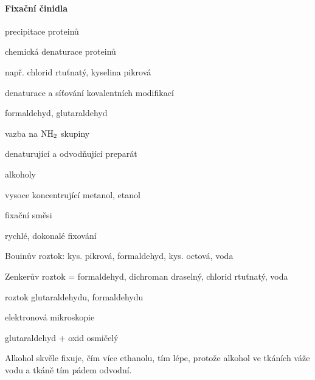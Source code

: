 \documentclass[DIV=8]{scrreprt}
\begin{document}
\paragraph{Fixační činidla}
\begin{myItemize}[nosep]
    \item precipitace proteinů
\begin{myItemize}[nosep]
    \item chemická denaturace proteinů
    \item např. chlorid rtuťnatý, kyselina pikrová
\end{myItemize}

    \item denaturace a síťování kovalentních modifikací
\begin{myItemize}[nosep]
    \item formaldehyd, glutaraldehyd
    \item vazba na \(\ce{NH2}\) skupiny
\end{myItemize}

    \item denaturující a odvodňující preparát
\begin{myItemize}[nosep]
    \item alkoholy
    \item vysoce koncentrující metanol, etanol
\end{myItemize}

    \item fixační směsi
\begin{myItemize}[nosep]
    \item rychlé, dokonalé fixování
    \item Bouinův roztok: kys. pikrová, formaldehyd, kys. octová, voda
    \item Zenkerův roztok = formaldehyd, dichroman draselný, chlorid rtuťnatý, voda
    \item roztok glutaraldehydu, formaldehydu
\end{myItemize}

    \item elektronová mikroskopie
\begin{myItemize}[nosep]
    \item glutaraldehyd + oxid osmičelý
\end{myItemize}

\end{myItemize}



Alkohol skvěle fixuje, čím více ethanolu, tím lépe, protože alkohol ve tkáních váže vodu a tkáně tím pádem odvodní.
\end{document}
